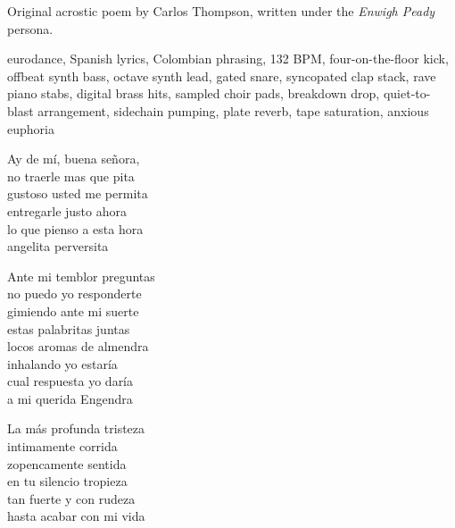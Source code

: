 
\begin{notes}
Original acrostic poem by Carlos Thompson, written under the \emph{Enwigh Peady} persona.
\end{notes}
\begin{style}
eurodance, Spanish lyrics, Colombian phrasing, 132 BPM, four-on-the-floor kick, offbeat synth bass, octave synth lead, gated snare, syncopated clap stack, rave piano stabs, digital brass hits, sampled choir pads, breakdown drop, quiet-to-blast arrangement, sidechain pumping, plate reverb, tape saturation, anxious euphoria
\end{style}
\begin{lyrics}

Ay de mí, buena señora,\\
no traerle mas que pita\\
gustoso usted me permita\\
entregarle justo ahora\\
lo que pienso a esta hora\\
angelita perversita


Ante mi temblor preguntas\\
no puedo yo responderte\\
gimiendo ante mi suerte\\
estas palabritas juntas\\
locos aromas de almendra\\
inhalando yo estaría\\
cual respuesta yo daría\\
a mi querida Engendra


La más profunda tristeza\\
intimamente corrida\\
zopencamente sentida\\
en tu silencio tropieza\\
tan fuerte y con rudeza\\
hasta acabar con mi vida

\end{lyrics}

